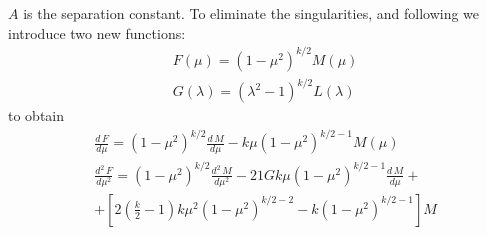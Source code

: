 $ A $ is the separation constant.  To eliminate the singularities, and following \cite{H2Plus2d1} we introduce two new functions:
\begin{equation}\label{eqNew}
\begin{split}
& F(\mu) = (1-\mu^2)^{k/2}M(\mu) \\[.8em]
& G(\lambda) = (\lambda^2-1)^{k/2}L(\lambda)
\end{split}
\end{equation}
to obtain
\begin{equation}
\begin{split}
& \frac{d\,F}{d\mu} =  (1-\mu^2)^{k/2}\frac{d\,M}{d\mu} - k\mu(1-\mu^2)^{k/2-1}M(\mu) \\[.8em]
& \frac{d^2\,F}{d\mu^2} =  (1-\mu^2)^{k/2}\frac{d^2\,M}{d\mu^2} - 21Gk\mu(1-\mu^2)^{k/2-1}\frac{d\,M}{d\mu} + \\[.8em]
& + \left[2\left(\frac{k}{2}-1\right)k\mu^2\left(1-\mu^2\right)^{k/2-2} - k(1 - \mu^2)^{k/2-1}\right]M
\end{split}
\end{equation}

